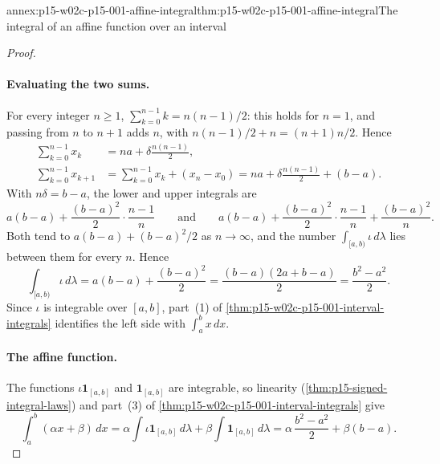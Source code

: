 \begin{annexitem}{annex:p15-w02c-p15-001-affine-integral}{thm:p15-w02c-p15-001-affine-integral}{The integral of an affine function over an interval}
\begin{proof}
\paragraph{Evaluating the two sums.}
For every integer \(n\geq1\), \(\sum_{k=0}^{n-1}k=n(n-1)/2\): this holds
for \(n=1\), and passing from \(n\) to \(n+1\) adds \(n\), with
\(n(n-1)/2+n=(n+1)n/2\). Hence
\[
 \begin{aligned}
 \sum_{k=0}^{n-1}x_k&=na+\delta\frac{n(n-1)}2,\\
 \sum_{k=0}^{n-1}x_{k+1}&=\sum_{k=0}^{n-1}x_k+(x_n-x_0)
 =na+\delta\frac{n(n-1)}2+(b-a).
 \end{aligned}
\]
With \(n\delta=b-a\), the lower and upper integrals are
\[
 a(b-a)+\frac{(b-a)^2}2\cdot\frac{n-1}n
 \qquad\text{and}\qquad
 a(b-a)+\frac{(b-a)^2}2\cdot\frac{n-1}n+\frac{(b-a)^2}n .
\]
Both tend to \(a(b-a)+(b-a)^2/2\) as \(n\to\infty\), and the number
\(\int_{[a,b)}\iota\,d\lambda\) lies between them for every \(n\). Hence
\[
 \int_{[a,b)}\iota\,d\lambda=a(b-a)+\frac{(b-a)^2}2
 =\frac{(b-a)(2a+b-a)}2=\frac{b^2-a^2}2 .
\]
Since \(\iota\) is integrable over \([a,b]\), part~(1) of
\cref{thm:p15-w02c-p15-001-interval-integrals} identifies the left side
with \(\int_a^bx\,dx\).

\paragraph{The affine function.}
The functions \(\iota\mathbf1_{[a,b]}\) and \(\mathbf1_{[a,b]}\) are
integrable, so linearity (\cref{thm:p15-signed-integral-laws}) and
part~(3) of \cref{thm:p15-w02c-p15-001-interval-integrals} give
\[
 \int_a^b(\alpha x+\beta)\,dx
 =\alpha\int\iota\mathbf1_{[a,b]}\,d\lambda+\beta\int\mathbf1_{[a,b]}\,d\lambda
 =\alpha\,\frac{b^2-a^2}2+\beta(b-a).
\]
\end{proof}
\end{annexitem}


